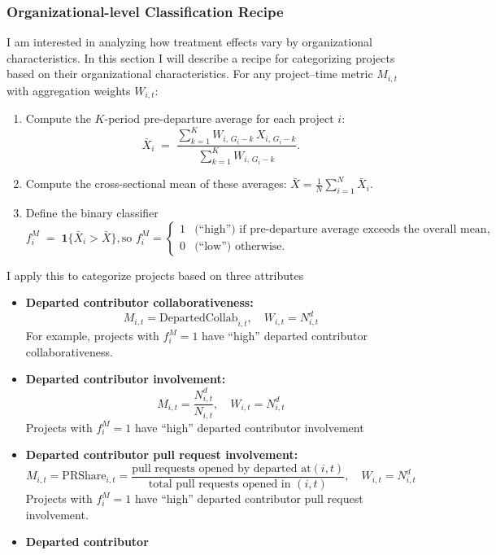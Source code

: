 \documentclass[12pt,notitlepage]{article}
\begin{document}
\subsubsection{Organizational-level Classification Recipe}
I am interested in analyzing how treatment effects vary by organizational characteristics. In this section I will describe a recipe for categorizing projects based on their organizational characteristics. For any project–time metric \(M_{i,t}\) with aggregation weights \(W_{i,t}\):
\begin{enumerate}
    \item Compute the \(K\)-period pre-departure average for each project \(i\):
   \[
     \bar X_i
     \;=\;
     \frac{\sum_{k=1}^{K} W_{i,\,G_i-k}\,X_{i,\,G_i-k}}
          {\sum_{k=1}^{K} W_{i,\,G_i-k}}.
   \]
    \item Compute the cross-sectional mean of these averages: 
     $\bar X = \frac{1}{N}\sum_{i=1}^N \bar X_i.$
    \item Define the binary classifier
   \[
     f_i^M \;=\; \mathbf{1}\{\bar X_i > \bar X\},
     \text{so }
     f_i^M = 
     \begin{cases}
       1 & \text{(``high'') if pre‐departure average exceeds the overall mean},\\
       0 & \text{(``low'') otherwise}.
     \end{cases}
   \]
\end{enumerate}
\medskip
I apply this to categorize projects based on three attributes
\begin{itemize}
  \setlength\itemsep{0.5em}
  \item \textbf{Departed contributor collaborativeness:}
    \[
      M_{i,t} = \mathrm{DepartedCollab}_{i,t},\quad
      W_{i,t} = N^d_{i,t}
    \]
    For example, projects with \(f_i^M=1\) have ``high'' departed contributor collaborativeness.
  \item \textbf{Departed contributor involvement:}
    \[
      M_{i,t} = \frac{N^d_{i,t}}{N_{i,t}},\quad
      W_{i,t} = N^d_{i,t}
    \]
    Projects with \(f_i^M=1\) have ``high'' departed contributor involvement
  \item \textbf{Departed contributor pull request involvement:}
    \[
      M_{i,t} = \mathrm{PRShare}_{i,t}
      = \frac{\text{pull requests opened by departed at}(i,t)}{\text{total pull requests opened in }(i,t)},
      \quad
      W_{i,t} = N^d_{i,t}
    \]
    Projects with \(f_i^M=1\) have ``high'' departed contributor  pull request involvement.
    \item \textbf{Departed contributor }
\end{itemize}
\end{document}
